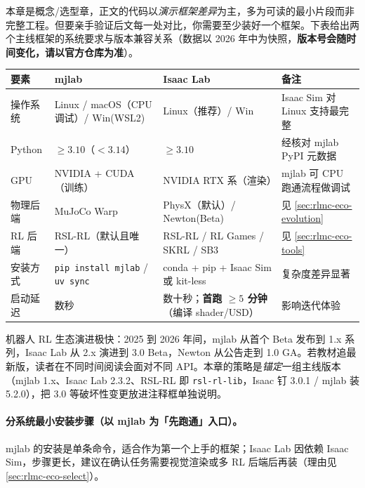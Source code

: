 本章是概念/选型章，正文的代码以\emph{演示框架差异}为主，多为可读的最小片段而非完整工程。但要亲手验证后文每一处对比，你需要至少装好一个框架。下表给出两个主线框架的系统要求与版本兼容关系（数据以 2026 年中为快照，\textbf{版本号会随时间变化，请以官方仓库为准}）。

\begin{center}
\small
\begin{tabular}{@{}llll@{}}
\toprule
要素 & mjlab & Isaac Lab & 备注 \\
\midrule
操作系统 & Linux / macOS（CPU 调试）/ Win(WSL2) & Linux（推荐）/ Win & Isaac Sim 对 Linux 支持最完整 \\
Python & $\ge 3.10$（$<3.14$） & $\ge 3.10$ & 经核对 mjlab PyPI 元数据\,\cite{mjlab2026} \\
GPU & NVIDIA + CUDA（训练）& NVIDIA RTX 系（渲染）& mjlab 可 CPU 跑通流程做调试 \\
物理后端 & MuJoCo Warp & PhysX（默认）/ Newton(Beta) & 见 \cref{sec:rlmc-eco-evolution} \\
RL 后端 & RSL-RL（默认且唯一）& RSL-RL / RL Games / SKRL / SB3 & 见 \cref{sec:rlmc-eco-tools} \\
安装方式 & \verb|pip install mjlab| / \verb|uv sync| & conda + pip + Isaac Sim 或 kit-less & 复杂度差异显著 \\
启动延迟 & 数秒 & 数十秒；\textbf{首跑 $\ge 5$ 分钟}（编译 shader/USD）& 影响迭代体验 \\
\bottomrule
\end{tabular}
\end{center}

\begin{note}
机器人 RL 生态演进极快：2025 到 2026 年间，mjlab 从首个 Beta 发布到 1.x 系列，Isaac Lab 从 2.x 演进到 3.0 Beta，Newton 从公告走到 1.0 GA。若教材追最新版，读者在不同时间阅读会面对不同 API。本章的策略是\emph{锚定}一组主线版本（mjlab 1.x、Isaac Lab 2.3.2、RSL-RL 即 \texttt{rsl-rl-lib}，Isaac 钉 3.0.1 / mjlab 装 5.2.0），把 3.0 等破坏性变更放进注释框单独说明。
\end{note}

\paragraph{分系统最小安装步骤（以 mjlab 为「先跑通」入口）。}mjlab 的安装是单条命令，适合作为第一个上手的框架；Isaac Lab 因依赖 Isaac Sim，步骤更长，建议在确认任务需要视觉渲染或多 RL 后端后再装（理由见 \cref{sec:rlmc-eco-select}）。

